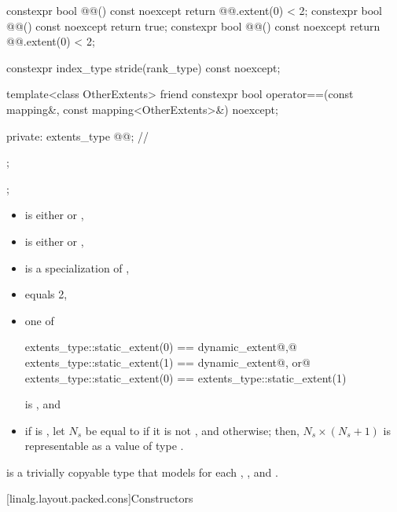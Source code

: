 \begin{codeblock}
{{{      constexpr bool @@() const noexcept {
        return @@.extent(0) < 2;
      }
      constexpr bool @@() const noexcept { return true; }
      constexpr bool @@() const noexcept {
        return @@.extent(0) < 2;
      }

      constexpr index_type stride(rank_type) const noexcept;

      template<class OtherExtents>
        friend constexpr bool operator==(const mapping&, const mapping<OtherExtents>&) noexcept;

    private:
      extents_type @@{};     // \expos
    };
  };
}
\end{codeblock}

\begin{itemdescr}
\pnum
\mandates
\begin{itemize}
\item
{} is either  or ,
\item
{} is either  or ,
\item
{} is a specialization of ,
\item
{} equals 2,
\item
one of
\begin{codeblock}
extents_type::static_extent(0) == dynamic_extent@\textrm{,}@
extents_type::static_extent(1) == dynamic_extent@\textrm{, or}@
extents_type::static_extent(0) == extents_type::static_extent(1)
\end{codeblock}
is , and
\item
if  is ,
let $N_s$ be equal to
 if it is not ,
and  otherwise; then,
$N_s \times (N_s + 1)$ is representable as a value of type .
\end{itemize}

\pnum
{} is a trivially copyable type
that models  for each , , and .
\end{itemdescr}

[linalg.layout.packed.cons]{Constructors}

